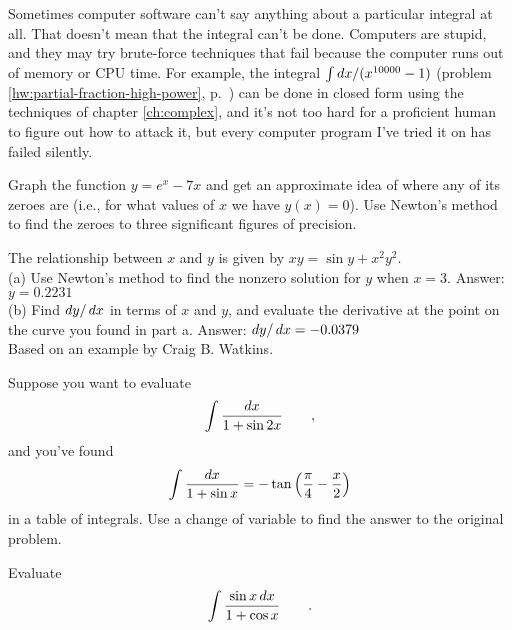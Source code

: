 Sometimes computer software can't say anything about a particular integral at all. That doesn't mean that the integral
can't be done. Computers are stupid, and they may try brute-force techniques that fail because the
computer runs out of memory or CPU time. For example, the integral $\int \mathop{d\!} x/(x^{10000}-1)$ 
(problem \ref{hw:partial-fraction-high-power}, p.~\pageref{hw:partial-fraction-high-power}) can be
done in closed form using the techniques of chapter \ref{ch:complex}, and it's not too hard for
a proficient human to figure out how to attack it, but every computer program I've tried it on has
failed silently.

\begin{hwsection}
\begin{hw}
Graph the function $y=e^x-7x$ and get an approximate idea of where any of its zeroes
are (i.e., for what values of $x$ we have $y(x)=0$).
Use Newton's method to find the zeroes to three significant figures of precision.
\end{hw}

\begin{hw}
The relationship between $x$ and $y$ is given by $xy = \sin y+x^2y^2$.\\
(a) Use Newton's method to find the nonzero solution for $y$ when $x=3$. Answer: $y=0.2231$\\
(b) Find $\mathop{d\!} y/\mathop{d\!} x$ in terms of $x$ and $y$, and evaluate the derivative
at the point on the curve you found in part a. Answer: $\mathop{d\!} y/\mathop{d\!} x=-0.0379$\\
{\footnotesize Based on an example by Craig B. Watkins.}
\end{hw}

\begin{hw}
Suppose you want to evaluate
\begin{equation*}
  \int \frac{\mathop{d\!} x}{1+\sin 2x} \qquad ,
\end{equation*}
and you've found
\begin{equation*}
  \int \frac{\mathop{d\!} x}{1+\sin x} = -\tan\left(\frac{\pi}{4}-\frac{x}{2}\right)
\end{equation*}
in a table of integrals. Use a change of variable to find the answer to the
original problem.
\end{hw}

\begin{hw}
Evaluate
\begin{equation*}
  \int \frac{\sin x \mathop{d\!} x}{1+\cos x} \qquad .
\end{equation*}
\end{hw}


\end{hwsection}
